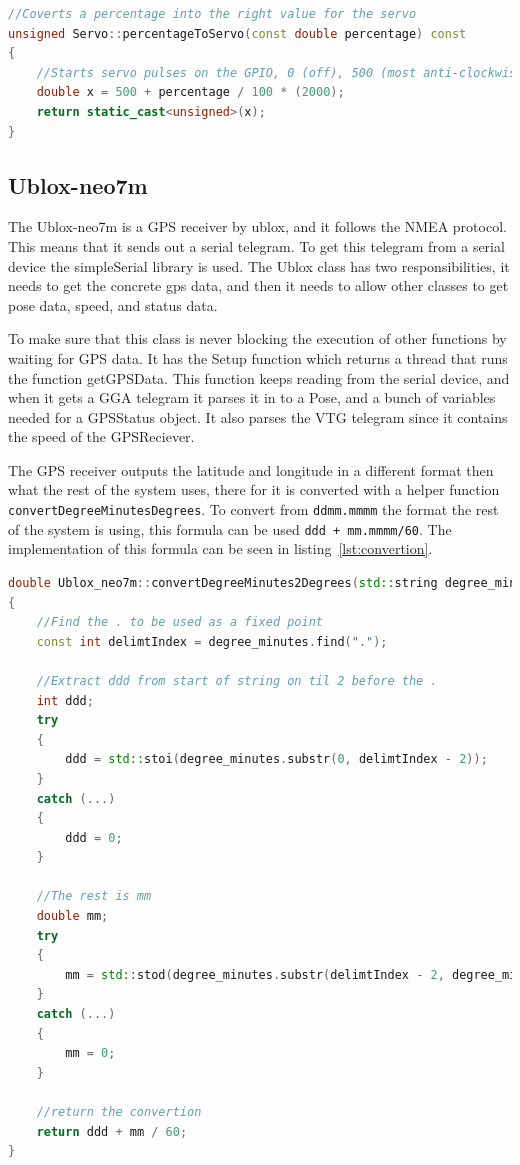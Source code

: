 \begin{lstlisting}[caption = {Percentage to servo periode convertion function}, captionpos=b, label={lst:percent2servo}, language=C++,firstnumber=1]
//Coverts a percentage into the right value for the servo
unsigned Servo::percentageToServo(const double percentage) const
{
	//Starts servo pulses on the GPIO, 0 (off), 500 (most anti-clockwise) to 2500 (most clockwise). 
	double x = 500 + percentage / 100 * (2000); 
	return static_cast<unsigned>(x);
}
\end{lstlisting}

\subsection{Ublox-neo7m}
The Ublox-neo7m is a GPS receiver by ublox, and it follows the NMEA protocol. This means that it sends out a serial telegram. To get this telegram from a serial device the simpleSerial library is used\cite{simple_serial}. The Ublox class has two responsibilities, it needs to get the concrete gps data, and then it needs to allow other classes to get pose data, speed, and status data. 

To make sure that this class is never blocking the execution of other functions by waiting for GPS data. It has the Setup function which returns a thread that runs the function getGPSData. This function keeps reading from the serial device, and when it gets a GGA telegram it parses it in to a Pose, and a bunch of variables needed for a GPSStatus object. It also parses the VTG telegram since it contains the speed of the GPSReciever. 

The GPS receiver outputs the latitude and longitude in a different format then what the rest of the system uses, there for it is converted with a helper function \texttt{convert\-Degree\-Minutes\-Degrees}. To convert from \texttt{ddmm.mmmm} the format the rest of the system is using, this formula can be used \texttt{ddd + mm.mmmm/60}\cite{convertion}. The implementation of this formula can be seen in listing~\ref{lst:convertion}.


\begin{lstlisting}[caption = {Convertion between latitude longitude formats}, captionpos=b, label={lst:convertion}, language=C++,firstnumber=1]
double Ublox_neo7m::convertDegreeMinutes2Degrees(std::string degree_minutes) const
{
	//Find the . to be used as a fixed point
	const int delimtIndex = degree_minutes.find(".");
	
	//Extract ddd from start of string on til 2 before the .
	int ddd;
	try
	{
		ddd = std::stoi(degree_minutes.substr(0, delimtIndex - 2));
	}
	catch (...)
	{
		ddd = 0;
	}
	
	//The rest is mm
	double mm;
	try
	{
		mm = std::stod(degree_minutes.substr(delimtIndex - 2, degree_minutes.length() - 1));
	}
	catch (...)
	{
		mm = 0;
	}
	
	//return the convertion
	return ddd + mm / 60;
}
\end{lstlisting}

